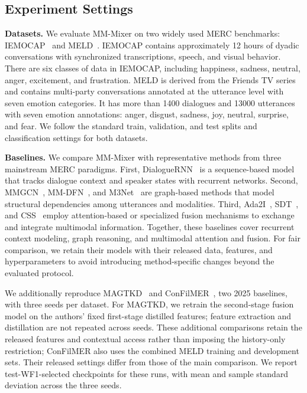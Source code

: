 \documentclass[letterpaper]{article} %
\begin{document}
\subsection{Experiment Settings}

\noindent\textbf{Datasets.}
We evaluate MM-Mixer on two widely used MERC benchmarks:
IEMOCAP~\cite{iemocap} and MELD~\cite{meld}. IEMOCAP contains
approximately 12 hours of dyadic conversations with synchronized
transcriptions, speech, and visual behavior. There are six classes of data in IEMOCAP, including happiness, sadness, neutral, anger, excitement, and frustration.
MELD is derived from the Friends TV series and contains multi-party conversations annotated at the utterance level with seven emotion categories.  It has more than 1400 dialogues and 13000 utterances with seven emotion annotations: anger, disgust, sadness, joy, neutral, surprise, and fear. We follow the standard train, validation, and test splits and classification settings for both datasets.

\noindent\textbf{Baselines.}
We compare MM-Mixer with representative methods from three mainstream
MERC paradigms. First, DialogueRNN~\cite{dialoguernn} is a sequence-based model that tracks dialogue context and speaker states with recurrent networks. Second, MMGCN~\cite{mmgcn},
MM-DFN~\cite{mmdfn}, and M3Net~\cite{m3net} are graph-based methods that model structural dependencies among utterances and modalities. Third, Ada2I~\cite{ada2i}, SDT~\cite{sdt}, and CSS~\cite{css} employ attention-based or specialized fusion mechanisms to exchange and
integrate multimodal information. Together, these baselines cover recurrent context modeling, graph reasoning, and multimodal attention and fusion. For fair comparison, we retain their models with their released data, features, and hyperparameters to avoid introducing method-specific changes beyond the evaluated protocol.

We additionally reproduce MAGTKD~\cite{magtkd} and ConFilMER~\cite{confilmer}, two 2025 baselines, with three seeds per dataset. For MAGTKD, we retrain the second-stage fusion model on the authors' fixed first-stage distilled features; feature extraction and distillation are not repeated across seeds. These additional comparisons retain the released features and contextual access rather than imposing the history-only restriction; ConFilMER also uses the combined MELD training and development sets. Their released settings differ from those of the main comparison. We report test-WF1-selected checkpoints for these runs, with mean and sample standard deviation across the three seeds.
\end{document}
